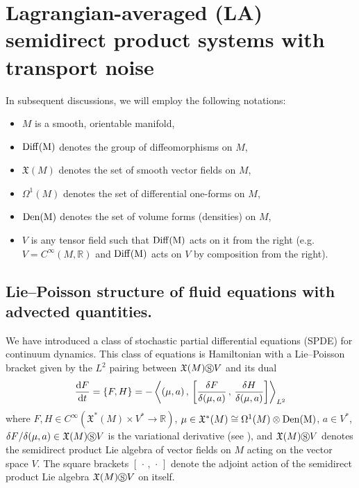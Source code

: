\documentclass[11pt, oneside]{article}   	%
\numberwithin{equation}{section}
\theoremstyle{plain}
\theoremstyle{definition}
\theoremstyle{remark}
\newcommand{\<}{\langle}
\renewcommand{\>}{\rangle}
\def\diff{\textnormal{d}}
\newcommand{\SCP}[2]{{\left\langle {#1}\, , \, {#2}\right\rangle}_{L^2}}
\begin{document}
\section{Lagrangian-averaged (LA) semidirect product systems with transport noise}\label{sec:LASDPsystems} 
In subsequent discussions, we will employ the following notations:
\begin{itemize}
\item $M$ is a smooth, orientable manifold,
\item $\rm{Diff}(M)$ denotes the group of diffeomorphisms on $M$,
\item $\mathfrak X(M)$ denotes the set of smooth vector fields on $M$,
\item $\Omega^1(M)$ denotes the set of differential one-forms on $M$,
\item $\rm{Den}(M)$ denotes the set of volume forms (densities) on $M$,
\item $V$ is any tensor field such that $\rm{Diff}(M)$ acts on it from the right (e.g. $V = C^\infty(M,\mathbb R)$ and $\rm{Diff}(M)$ acts on $V$ by composition from the right).
\end{itemize}

\subsection{Lie--Poisson structure of fluid equations with advected quantities.} \label{2-1}

We have introduced a class of stochastic partial differential equations (SPDE) for continuum dynamics. 
This class of equations is Hamiltonian with a Lie--Poisson bracket given by the $L^2$ pairing between $\mathfrak{X}(M) \circledS V$ and its dual \cite{HMR1998} 
\begin{align}
\frac{\diff F}{\diff t}=\{ F, H\} 
= 
-\,\SCP{(\mu,a)}{\left[ \frac{\delta F}{\delta (\mu,a)}\,,\, \frac{\delta H}{\delta (\mu,a)} \right]}%
\label{LP-Brkt}
\end{align}
where $F,H\in C^\infty(\mathfrak X^*(M) \times V^* \to \mathbb R)$, $\mu \in \mathfrak X^*(M) \cong \Omega^1(M) \otimes \rm{Den}(M)$, $a\in V^*$, ${\delta F}/{\delta (\mu,a)}\in \mathfrak{X}(M) \circledS V$ is the variational derivative (see \cite{marsden1983coadjoint}), and $\mathfrak{X}(M) \circledS V$ denotes the semidirect product Lie algebra of vector fields on $M$ acting on the vector space $V$. The square brackets $[\,\cdot\,,\,\cdot\,]$ denote the adjoint action of the semidirect product Lie algebra $\mathfrak{X}(M) \circledS V$ on itself.
\end{document}
